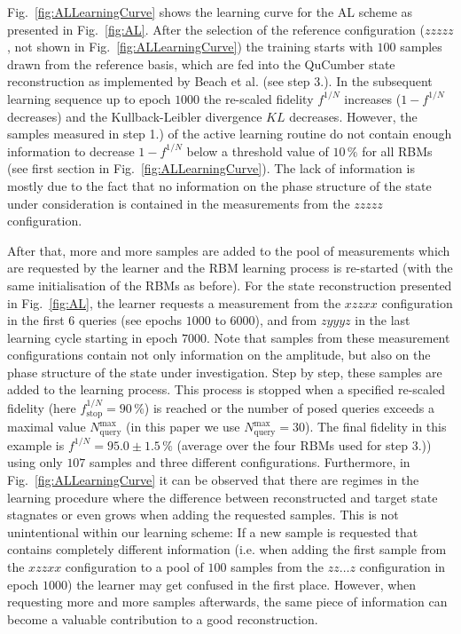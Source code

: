 \documentclass[pra,aps,showpacs,groupedaddress,superscriptaddress,twocolumn,toc=flat,biblatex,footinbib]{revtex4-1}
\begin{document}
Fig.~\ref{fig:ALLearningCurve} shows the learning curve for the AL scheme as presented in Fig.~\ref{fig:AL}. After the selection of the reference configuration ($zzzzz$, not shown in Fig.~\ref{fig:ALLearningCurve}) the training starts with $100$ samples drawn from the reference basis, which are fed into the QuCumber state reconstruction as implemented by Beach et al. \cite{Beach2019} (see step 3.). In the subsequent learning sequence up to epoch $1000$ the re-scaled fidelity $f^{1/N}$ increases ($1-f^{1/N}$ decreases) and the Kullback-Leibler divergence $KL$ decreases. However, the samples measured in step 1.) of the active learning routine do not contain enough information to decrease $1-f^{1/N}$ below a threshold value of $10\, \%$ for all RBMs (see first section in Fig.~\ref{fig:ALLearningCurve}). The lack of information is mostly due to the fact that no information on the phase structure of the state under consideration is contained in the measurements from the $zzzzz$ configuration. 

After that, more and more samples are added to the pool of measurements which are requested by the learner and the RBM learning process is re-started (with the same initialisation of the RBMs as before). For the state reconstruction presented in Fig.~\ref{fig:AL}, the learner requests a measurement from the $xzzxx$ configuration in the first $6$ queries (see epochs $1000$ to $6000$), and from $zyyyz$ in the last learning cycle starting in epoch $7000$. Note that samples from these measurement configurations contain not only information on the amplitude, but also on the phase structure of the state under investigation. Step by step, these samples are added to the learning process. This process is stopped when a specified re-scaled fidelity (here $f^{1/N}_{\mathrm{stop}}=90\, \%$) is reached or the number of posed queries exceeds a maximal value $N_{\mathrm{query}}^{\mathrm{max}}$ (in this paper we use $N_{\mathrm{query}}^{\mathrm{max}}=30$). The final fidelity in this example is $f^{1/N}=95.0 \pm 1.5
\,\%$ (average over the four RBMs used for step 3.)) using only $107$ samples and three different configurations. Furthermore, in Fig.~\ref{fig:ALLearningCurve} it can be observed that there are regimes in the learning procedure where the difference between reconstructed and target state stagnates or even grows when adding the requested samples. This is not unintentional within our learning scheme: If a new sample is requested that contains completely different information (i.e. when adding the first sample from the $xzzxx$ configuration to a pool of $100$ samples from the $zz\dots z$ configuration in epoch $1000$) the learner may get confused in the first place. However, when requesting more and more samples afterwards, the same piece of information can become a valuable contribution to a good reconstruction.
\end{document}
